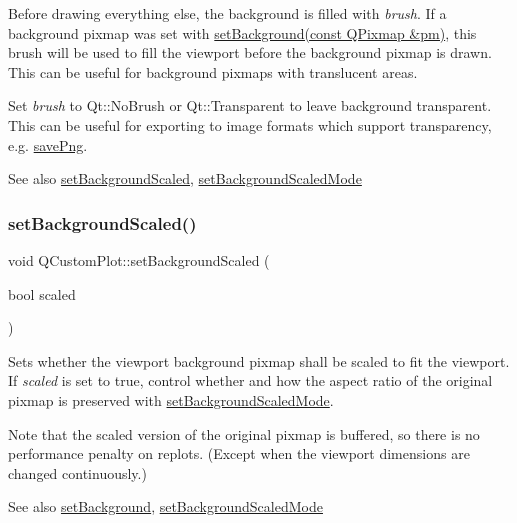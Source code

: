 Before drawing everything else, the background is filled with {\itshape brush}. If a background pixmap was set with \hyperlink{class_q_custom_plot_a130358592cfca353ff3cf5571b49fb00}{set\+Background(const Q\+Pixmap \&pm)}, this brush will be used to fill the viewport before the background pixmap is drawn. This can be useful for background pixmaps with translucent areas.

Set {\itshape brush} to Qt\+::\+No\+Brush or Qt\+::\+Transparent to leave background transparent. This can be useful for exporting to image formats which support transparency, e.\+g. \hyperlink{class_q_custom_plot_ac92cc9256d12f354b40a4be4600b5fb9}{save\+Png}.

\begin{DoxySeeAlso}{See also}
\hyperlink{class_q_custom_plot_a36f0fa1317325dc7b7efea615ee2de1f}{set\+Background\+Scaled}, \hyperlink{class_q_custom_plot_a4c0eb4865b7949f62e1cb97db04a3de0}{set\+Background\+Scaled\+Mode} 
\end{DoxySeeAlso}
\mbox{\label{class_q_custom_plot_a36f0fa1317325dc7b7efea615ee2de1f}} 
\subsubsection{\texorpdfstring{set\+Background\+Scaled()}{setBackgroundScaled()}}
{\footnotesize\ttfamily void Q\+Custom\+Plot\+::set\+Background\+Scaled (\begin{DoxyParamCaption}\item[{bool}]{scaled }\end{DoxyParamCaption})}

Sets whether the viewport background pixmap shall be scaled to fit the viewport. If {\itshape scaled} is set to true, control whether and how the aspect ratio of the original pixmap is preserved with \hyperlink{class_q_custom_plot_a4c0eb4865b7949f62e1cb97db04a3de0}{set\+Background\+Scaled\+Mode}.

Note that the scaled version of the original pixmap is buffered, so there is no performance penalty on replots. (Except when the viewport dimensions are changed continuously.)

\begin{DoxySeeAlso}{See also}
\hyperlink{class_q_custom_plot_a130358592cfca353ff3cf5571b49fb00}{set\+Background}, \hyperlink{class_q_custom_plot_a4c0eb4865b7949f62e1cb97db04a3de0}{set\+Background\+Scaled\+Mode} 
\end{DoxySeeAlso}
\mbox{\label{class_q_custom_plot_a4c0eb4865b7949f62e1cb97db04a3de0}} 
